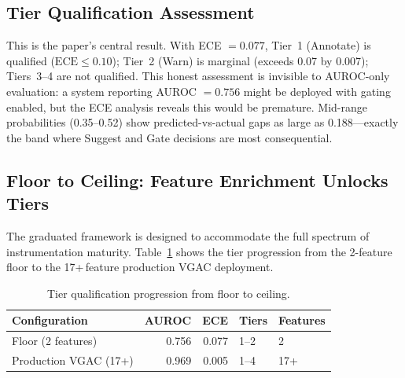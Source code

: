 \documentclass[sigconf]{acmart}
\begin{document}
\subsection{Tier Qualification Assessment}
This is the paper's central result. With ECE $=0.077$, Tier~1 (Annotate) is qualified ($\text{ECE}\le 0.10$); Tier~2 (Warn) is marginal (exceeds 0.07 by 0.007); Tiers~3--4 are not qualified. This honest assessment is invisible to AUROC-only evaluation: a system reporting AUROC $=0.756$ might be deployed with gating enabled, but the ECE analysis reveals this would be premature. Mid-range probabilities (0.35--0.52) show predicted-vs-actual gaps as large as 0.188---exactly the band where Suggest and Gate decisions are most consequential.

\subsection{Floor to Ceiling: Feature Enrichment Unlocks Tiers}
The graduated framework is designed to accommodate the full spectrum of instrumentation maturity. Table~\ref{tab:ceiling} shows the tier progression from the 2-feature floor to the 17+\,feature production VGAC deployment.

\begin{table}[t]
\centering
\caption{Tier qualification progression from floor to ceiling.}
\label{tab:ceiling}
\small
\begin{tabular}{@{}lrrll@{}}
\toprule
\textbf{Configuration}      & \textbf{AUROC} & \textbf{ECE}   & \textbf{Tiers} & \textbf{Features} \\
\midrule
Floor (2 features)          & 0.756          & 0.077          & 1--2           & 2     \\
Production VGAC (17+)       & 0.969          & 0.005          & 1--4           & 17+   \\
\bottomrule
\end{tabular}
\end{table}
\end{document}
